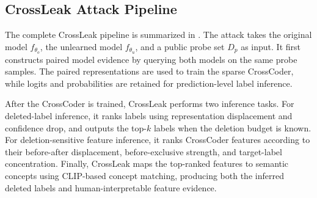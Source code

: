\subsection{CrossLeak Attack Pipeline}
\label{sec:approach_pipeline}

The complete CrossLeak pipeline is summarized in . The attack takes the original model $f_{\theta_o}$, the unlearned model $f_{\theta_u}$, and a public probe set $D_p$ as input. It first constructs paired model evidence by querying both models on the same probe samples. The paired representations are used to train the sparse CrossCoder, while logits and probabilities are retained for prediction-level label inference.

After the CrossCoder is trained, CrossLeak performs two inference tasks. For deleted-label inference, it ranks labels using representation displacement and confidence drop, and outputs the top-$k$ labels when the deletion budget is known. For deletion-sensitive feature inference, it ranks CrossCoder features according to their before-after displacement, before-exclusive strength, and target-label concentration. Finally, CrossLeak maps the top-ranked features to semantic concepts using CLIP-based concept matching, producing both the inferred deleted labels and human-interpretable feature evidence.


